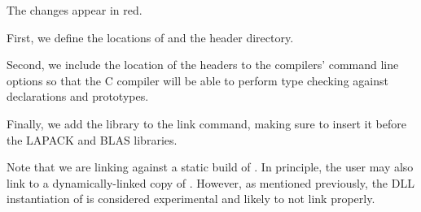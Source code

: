 \noindent
The changes appear in red.

First, we define the locations of \libflame and the \libflame header directory.

Second, we include the location of the \libflame headers to the compilers'
command line options so that the C compiler will be able to perform type
checking against \libflame declarations and prototypes.

Finally, we add the \libflame library to the link command, making sure to
insert it before the LAPACK and BLAS libraries.

Note that we are linking against a static build of \libflamens.
In principle, the user may also link to a dynamically-linked copy of
\libflamens.
However, as mentioned previously, the DLL instantiation of \libflame is
considered experimental and likely to not link properly.






